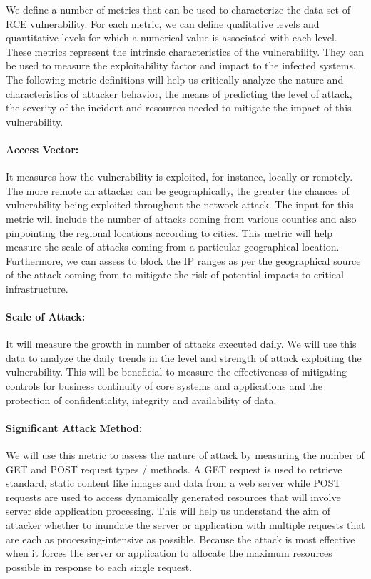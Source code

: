 We define a number of metrics that can be used to characterize the data set of RCE vulnerability. For each metric, we can define qualitative levels and quantitative levels for which a numerical value is associated with each level. These metrics represent the intrinsic characteristics of the vulnerability. They can be used to measure the exploitability factor and impact to the infected systems. The following metric definitions will help us critically analyze the nature and characteristics of attacker behavior, the means of predicting the level of attack, the severity of the incident and resources needed to mitigate the impact of this vulnerability.
\indent
\paragraph{Access Vector:}
It measures how the vulnerability is exploited, for instance, locally or remotely. The more remote an attacker can be geographically, the greater the chances of vulnerability being exploited throughout the network attack.  The input for this metric will include the number of attacks coming from various counties and also pinpointing the regional locations according to cities. This metric will help measure the scale of attacks coming from a particular geographical location. Furthermore, we can assess to block the IP ranges as per the geographical source of the attack coming from to mitigate the risk of potential impacts to critical infrastructure.
\indent
\paragraph{Scale of Attack:}
It will measure the growth in number of attacks executed daily. We will use this data to analyze the daily trends in the level and strength of attack exploiting the vulnerability. This will be beneficial to measure the effectiveness of mitigating controls for business continuity of core systems and applications and the protection of confidentiality, integrity and availability of data.
\indent
\paragraph{Significant Attack Method:}
We will use this metric to assess the nature of attack by measuring the number of GET and POST request types / methods. A GET request is used to retrieve standard, static content like images and data from a web server while POST requests are used to access dynamically generated resources that will involve server side application processing. This will help us understand the aim of attacker whether to inundate the server or application with multiple requests that are each as processing-intensive as possible. Because the attack is most effective when it forces the server or application to allocate the maximum resources possible in response to each single request.
\indent
